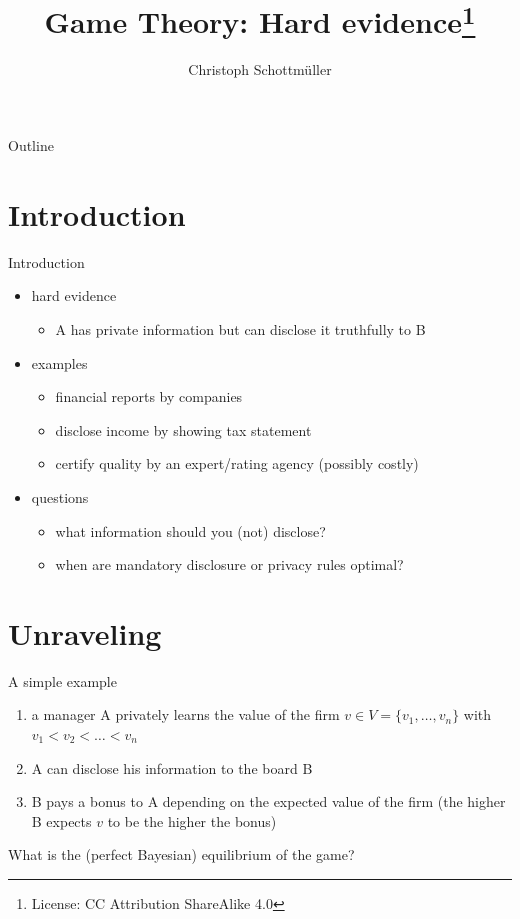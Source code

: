 \documentclass[bigger]{beamer}
\author{Christoph Schottmüller}
\date{}
\title{Game Theory: Hard evidence\footnote{License: CC Attribution ShareAlike 4.0}}
\begin{document}
\maketitle
\begin{frame}{Outline}
\tableofcontents
\end{frame}



\section{Introduction}
\label{sec:orgheadline2}

\begin{frame}[label={sec:orgheadline1}]{Introduction}
\begin{itemize}
\item hard evidence
\begin{itemize}
\item A has private information but can disclose it truthfully to B
\end{itemize}
\item examples
\begin{itemize}
\item financial reports by companies
\item disclose income by showing tax statement
\item certify quality by an expert/rating agency (possibly costly)
\end{itemize}
\item questions
\begin{itemize}
\item what information should you (not) disclose?
\item when are mandatory disclosure or privacy rules optimal?
\end{itemize}
\end{itemize}
\end{frame}

\section{Unraveling}
\label{sec:orgheadline6}

\begin{frame}[label={sec:orgheadline3}]{A simple example}
\begin{enumerate}
\item a manager A privately learns the value of the firm \(v\in V=\{v_1,\dots,v_n\}\) with \(v_1<v_2<\dots<v_n\)
\item A can disclose his information to the board B
\item B pays a bonus to A depending on the expected value of the firm (the higher B expects \(v\) to be the higher the bonus)
\end{enumerate}

\vspace*{1cm}

What is the (perfect Bayesian) equilibrium of the game?
\end{frame}
\end{document}
